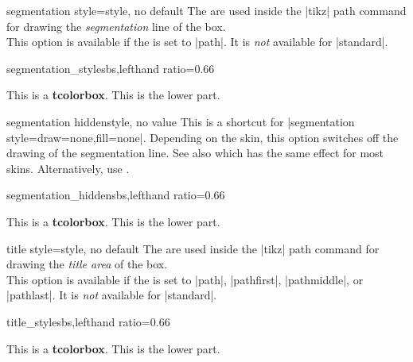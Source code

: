 \clearpage
\begin{docTcbKey}{segmentation style}{=}{style, no default}
  The  are used inside the |tikz| path command
  for drawing the \emph{segmentation} line of the box.\\
  This option is available if the 
  is set to |path|.
  It is \emph{not} available for |standard|.
\begin{exdispExample*}{segmentation_style}{sbs,lefthand ratio=0.66}

\begin{tcolorbox}[enhanced,title=My title,
  segmentation style={double=white,draw=blue,
                  double distance=1pt,solid}]
This is a \textbf{tcolorbox}.
\tcblower
This is the lower part.
\end{tcolorbox}
\end{exdispExample*}
\end{docTcbKey}


\begin{docTcbKey}{segmentation hidden}{}{style, no value}
  This is a shortcut for |segmentation style={draw=none,fill=none}|.
  Depending on the skin, this option switches off the drawing of the
  segmentation line. See also  which
  has the same effect for most skins.
  Alternatively, use .
\begin{exdispExample*}{segmentation_hidden}{sbs,lefthand ratio=0.66}

\begin{tcolorbox}[title=My title,
  enhanced,segmentation hidden]
This is a \textbf{tcolorbox}.
\tcblower
This is the lower part.
\end{tcolorbox}
\end{exdispExample*}
\end{docTcbKey}


\begin{docTcbKey}{title style}{=}{style, no default}
  The  are used inside the |tikz| path command
  for drawing the \emph{title area} of the box.\\
  This option is available if the  is set to
  |path|, |pathfirst|, |pathmiddle|, or |pathlast|.
  It is \emph{not} available for |standard|.
\begin{exdispExample*}{title_style}{sbs,lefthand ratio=0.66}

\begin{tcolorbox}[enhanced,title=My title,
  title style={left color=blue!15!yellow,
               right color=red!85!black}]
This is a \textbf{tcolorbox}.
\tcblower
This is the lower part.
\end{tcolorbox}
\end{exdispExample*}
\end{docTcbKey}

